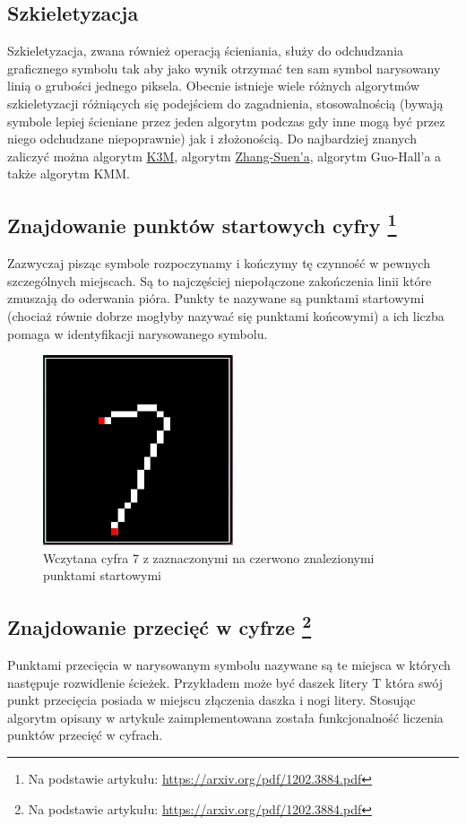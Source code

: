 \documentclass{article}
\begin{document}
\subsection{Szkieletyzacja}
Szkieletyzacja, zwana również operacją ścieniania, służy do odchudzania graficznego symbolu tak aby jako wynik otrzymać ten sam symbol narysowany linią o grubości jednego piksela. Obecnie istnieje wiele różnych algorytmów szkieletyzacji różniących się podejściem do zagadnienia, stosowalnością (bywają symbole lepiej ścieniane przez jeden algorytm podczas gdy inne mogą być przez niego odchudzane niepoprawnie) jak i złożonością. Do najbardziej znanych zaliczyć można algorytm \href{http://matwbn.icm.edu.pl/ksiazki/amc/amc20/amc2029.pdf}{K3M}, algorytm \href{https://rosettacode.org/wiki/Zhang-Suen_thinning_algorithm}{Zhang-Suen'a}, algorytm Guo-Hall’a a także algorytm KMM.

\subsection{Znajdowanie punktów startowych cyfry \protect\footnote{Na podstawie artykułu: \href{https://arxiv.org/pdf/1202.3884.pdf}{https://arxiv.org/pdf/1202.3884.pdf} } }
Zazwyczaj pisząc symbole rozpoczynamy i kończymy tę czynność w pewnych szczególnych miejscach. Są to najczęściej niepołączone zakończenia linii które zmuszają do oderwania pióra. Punkty te nazywane są punktami startowymi (chociaż równie dobrze mogłyby nazywać się punktami końcowymi) a ich liczba pomaga w identyfikacji narysowanego symbolu.

\begin{figure}[htp]
	\centering
	\includegraphics[width=0.5\textwidth]{Figures/starting_points.png}
	\caption{ Wczytana cyfra 7 z zaznaczonymi na czerwono znalezionymi punktami startowymi }
\end{figure}

\subsection{Znajdowanie przecięć w cyfrze \protect\footnote{Na podstawie artykułu: \href{https://arxiv.org/pdf/1202.3884.pdf}{https://arxiv.org/pdf/1202.3884.pdf} } }
Punktami przecięcia w narysowanym symbolu nazywane są te miejsca w których następuje rozwidlenie ścieżek. Przykładem może być daszek litery T która swój punkt przecięcia posiada w miejscu złączenia daszka i nogi litery. Stosując algorytm opisany w artykule zaimplementowana została funkcjonalność liczenia punktów przecięć w cyfrach.
\end{document}
